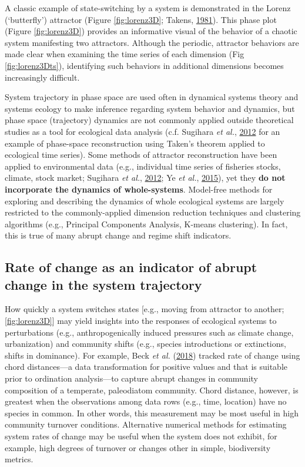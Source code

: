 \documentclass[print]{nuthesis}
\begin{document}
A classic example of state-switching by a system is demonstrated in the Lorenz (`butterfly') attractor (Figure \ref{fig:lorenz3D}; Takens, \protect\hyperlink{ref-takens1981detecting}{1981}). This phase plot (Figure \ref{fig:lorenz3D}) provides an informative visual of the behavior of a chaotic system manifesting two attractors. Although the periodic, attractor behaviors are made clear when examining the time series of each dimension (Fig \ref{fig:lorenz3Dts}), identifying such behaviors in additional dimensions becomes increasingly difficult.

System trajectory in phase space are used often in dynamical systems theory and systems ecology to make inference regarding system behavior and dynamics, but phase space (trajectory) dynamics are not commonly applied outside theoretical studies as a tool for ecological data analysis (c.f. Sugihara \emph{et al.}, \protect\hyperlink{ref-sugihara2012detecting}{2012} for an example of phase-space reconstruction using Taken's theorem applied to ecological time series). Some methods of attractor reconstruction have been applied to environmental data (e.g., individual time series of fisheries stocks, climate, stock market; Sugihara \emph{et al.}, \protect\hyperlink{ref-sugihara2012detecting}{2012}; Ye \emph{et al.}, \protect\hyperlink{ref-ye2015equation}{2015}), yet they \textbf{do not incorporate the dynamics of whole-systems}. Model-free methods for exploring and describing the dynamics of whole ecological systems are largely restricted to the commonly-applied dimension reduction techniques and clustering algorithms (e.g., Principal Components Analysis, K-means clustering). In fact, this is true of many abrupt change and regime shift indicators.

\hypertarget{rate-of-change-as-an-indicator-of-abrupt-change-in-the-system-trajectory}{%
\subsection{Rate of change as an indicator of abrupt change in the system trajectory}\label{rate-of-change-as-an-indicator-of-abrupt-change-in-the-system-trajectory}}

How quickly a system switches states {[}e.g., moving from attractor to another; \ref{fig:lorenz3D}{]} may yield insights into the responses of ecological systems to perturbations (e.g., anthropogenically induced pressures such as climate change, urbanization) and community shifts (e.g., species introductions or extinctions, shifts in dominance). For example, Beck \emph{et al.} (\protect\hyperlink{ref-beck_variance_2018}{2018}) tracked rate of change using chord distances---a data transformation for positive values and that is suitable prior to ordination analysis---to capture abrupt changes in community composition of a temperate, paleodiatom community. Chord distance, however, is greatest when the observations among data rows (e.g., time, location) have no species in common. In other words, this measurement may be most useful in high community turnover conditions. Alternative numerical methods for estimating system rates of change may be useful when the system does not exhibit, for example, high degrees of turnover or changes other in simple, biodiversity metrics.
\end{document}
